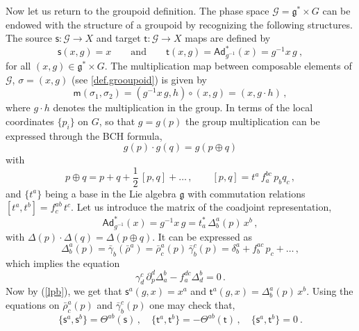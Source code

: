 \documentclass[12pt,a4paper]{article}
\numberwithin{equation}{section}
\theoremstyle{definition}
\newcommand{\sfs}{\mathsf{s}}
\newcommand{\sft}{\mathsf{t}}
\newcommand{\sfm}{\mathsf{m}}
\begin{document}
Now let us return to the groupoid definition. {The phase space $\mathcal{G}=\mathfrak{g}^\ast\times G$ can be endowed with the structure of a groupoid by recognizing the following structures}. The source $\sfs:\mathcal{G}\to X$ and target $\sft:\mathcal{G}\to X$ maps are defined by
\begin{equation}\label{lpb}
 \sfs(x,g)= x \qquad \text{and} \qquad \sft(x,g)=\mathsf{Ad}_{g^{-1}}^\ast(x)=g^{-1}x\,g \ ,
 \end{equation}
for all $(x,g)\in \mathfrak{g}^\ast\times G$. 
{The multiplication map between composable elements of  $\mathcal{G}$,  $\sigma=(x,g)$ (see \ref{def.grooupoid})
is given by
 \begin{equation}\label{multel}
\sfm(\sigma_1,\sigma_2)=
\left(g^{-1}x\,g,h\right) \circ (x,g)=(x,g\cdot h)\,,
\end{equation} }
where $g\cdot h$ denotes the multiplication in  the group.
In terms of the local coordinates $\{p_i\}$ on $G$, so that $g=g(p)$  the group multiplication  can be expressed through the BCH formula,
\begin{equation}\label{BCH}
g(p)\cdot g(q)=g(p\oplus q)
\end{equation}
 with
\begin{equation}
p\oplus q=p+q+\frac12\,[p,q]+\dots\,,\qquad [p,q]=t^a\,f^{bc}_a\,p_bq_c\,,
\end{equation}
and $\{t^a\}$ being a base in the Lie algebra $\mathfrak{g}$ with commutation relations $[t^a,t^b]=f^{ab}_c\,t^c$. Let us introduce the matrix of the coadjoint representation,
\begin{equation}\label{mar}
\mathsf{Ad}_{g^{-1}}^\ast(x)=g^{-1}x\,g=t^\ast_a\,\Delta^a_b(p)\,x^b\,,
\end{equation}
with $\Delta(p)\cdot\Delta(q)=\Delta(p\oplus q)$. %
It can be expressed as
\begin{equation}\label{Delta}
\Delta^a_b(p)=\bar\gamma_b(\bar \rho^a)=\bar\rho^a_c(p)\,\bar\gamma^c_b(p)=\delta^a_b+f^{ac}_b\,p_c+ \dots\,,
\end{equation}
which implies the equation
\begin{equation}\label{eqDelta}
\gamma^c_d\,\partial^d_p\Delta^b_a-f^{dc}_a\Delta_d^b=0\,.
\end{equation}
Now by (\ref{lpb}), we get that $\sfs^a(g,x)=x^a$ and $\sft^a(g,x)=\Delta^a_b(p)\,x^b$. Using the equations on $\bar\rho^a_c(p)$ and $\bar\gamma^c_b(p)$ one may check that,
\begin{equation}\label{s-t}
     \{\sfs^a, \sfs^b\}=\Theta^{ab}(\sfs) \,,\quad    \{\sft^a, \sft^b\}=-\Theta^{ab}(\sft) \,,\quad   \{\sfs^a, \sft^b\}=0 \ .
     \end{equation}
\end{document}
